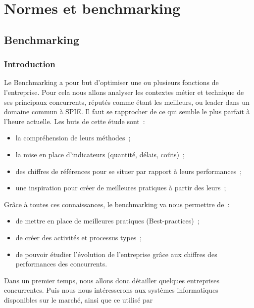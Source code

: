 \chapter{Normes et benchmarking}
\section{Benchmarking}
\subsection{Introduction}
	Le Benchmarking a pour but d'optimiser une ou plusieurs fonctions de l'entreprise. Pour cela nous allons analyser les contextes métier et technique de ses principaux concurrents, réputés comme étant les meilleurs, ou leader dans un domaine commun à SPIE. Il faut se rapprocher de ce qui semble le plus parfait à l'heure actuelle.
	Les buts de cette étude sont~:
\begin{itemize}
	\item la compréhension de leurs méthodes~;
	\item la mise en place d'indicateurs (quantité, délais, coûts)~;
	\item des chiffres de références pour se situer par rapport à leurs performances~;
	\item une inspiration pour créer de meilleures pratiques à partir des leurs~;
\end{itemize}
	Grâce à toutes ces connaissances, le benchmarking va nous permettre de~:
\begin{itemize}
	\item de mettre en place de meilleures pratiques (Best-practices)~;
	\item de créer des activités et processus types~;
	\item de pouvoir étudier l'évolution de l'entreprise grâce aux chiffres des performances des concurrents.
\end{itemize}

	Dans un premier temps, nous allons donc détailler quelques entreprises concurrentes. Puis nous nous intéresserons aux systèmes informatiques disponibles sur le marché, ainsi que ce utilisé par   
